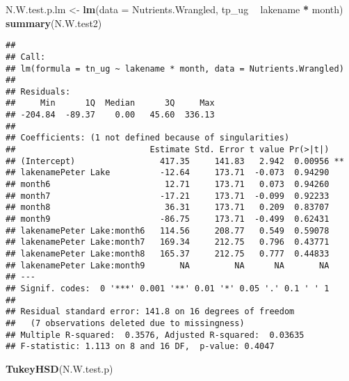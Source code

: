 \documentclass[]{article}
\newenvironment{Shaded}{\begin{snugshade}}{\end{snugshade}}
\newcommand{\DataTypeTok}[1]{\textcolor[rgb]{0.13,0.29,0.53}{#1}}
\newcommand{\KeywordTok}[1]{\textcolor[rgb]{0.13,0.29,0.53}{\textbf{#1}}}
\newcommand{\NormalTok}[1]{#1}
\newcommand{\OperatorTok}[1]{\textcolor[rgb]{0.81,0.36,0.00}{\textbf{#1}}}
\newcommand{\StringTok}[1]{\textcolor[rgb]{0.31,0.60,0.02}{#1}}
\begin{document}
\begin{Shaded}
\begin{Highlighting}[]
\NormalTok{N.W.test.p.lm <-}\StringTok{ }\KeywordTok{lm}\NormalTok{(}\DataTypeTok{data =}\NormalTok{ Nutrients.Wrangled, tp_ug }\OperatorTok{~}\StringTok{ }\NormalTok{lakename }\OperatorTok{*}\StringTok{ }\NormalTok{month)}
\KeywordTok{summary}\NormalTok{(N.W.test2)}
\end{Highlighting}
\end{Shaded}

\begin{verbatim}
## 
## Call:
## lm(formula = tn_ug ~ lakename * month, data = Nutrients.Wrangled)
## 
## Residuals:
##     Min      1Q  Median      3Q     Max 
## -204.84  -89.37    0.00   45.60  336.13 
## 
## Coefficients: (1 not defined because of singularities)
##                           Estimate Std. Error t value Pr(>|t|)   
## (Intercept)                 417.35     141.83   2.942  0.00956 **
## lakenamePeter Lake          -12.64     173.71  -0.073  0.94290   
## month6                       12.71     173.71   0.073  0.94260   
## month7                      -17.21     173.71  -0.099  0.92233   
## month8                       36.31     173.71   0.209  0.83707   
## month9                      -86.75     173.71  -0.499  0.62431   
## lakenamePeter Lake:month6   114.56     208.77   0.549  0.59078   
## lakenamePeter Lake:month7   169.34     212.75   0.796  0.43771   
## lakenamePeter Lake:month8   165.37     212.75   0.777  0.44833   
## lakenamePeter Lake:month9       NA         NA      NA       NA   
## ---
## Signif. codes:  0 '***' 0.001 '**' 0.01 '*' 0.05 '.' 0.1 ' ' 1
## 
## Residual standard error: 141.8 on 16 degrees of freedom
##   (7 observations deleted due to missingness)
## Multiple R-squared:  0.3576, Adjusted R-squared:  0.03635 
## F-statistic: 1.113 on 8 and 16 DF,  p-value: 0.4047
\end{verbatim}

\begin{Shaded}
\begin{Highlighting}[]
\KeywordTok{TukeyHSD}\NormalTok{(N.W.test.p)}
\end{Highlighting}
\end{Shaded}
\end{document}
